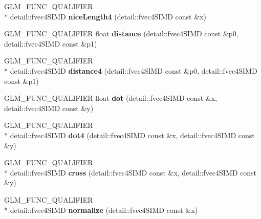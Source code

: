 \begin{DoxyCompactItemize}
\item 
\hypertarget{namespaceglm_a8279db21d38cadc5efaa0c8efababb1b}{G\-L\-M\-\_\-\-F\-U\-N\-C\-\_\-\-Q\-U\-A\-L\-I\-F\-I\-E\-R \\*
detail\-::fvec4\-S\-I\-M\-D {\bfseries nice\-Length4} (detail\-::fvec4\-S\-I\-M\-D const \&x)}\label{namespaceglm_a8279db21d38cadc5efaa0c8efababb1b}

\item 
\hypertarget{namespaceglm_ae716903872179576658f5eb6e2632558}{G\-L\-M\-\_\-\-F\-U\-N\-C\-\_\-\-Q\-U\-A\-L\-I\-F\-I\-E\-R float {\bfseries distance} (detail\-::fvec4\-S\-I\-M\-D const \&p0, detail\-::fvec4\-S\-I\-M\-D const \&p1)}\label{namespaceglm_ae716903872179576658f5eb6e2632558}

\item 
\hypertarget{namespaceglm_a5256e6d2d2a82b810f92fc02f64819fb}{G\-L\-M\-\_\-\-F\-U\-N\-C\-\_\-\-Q\-U\-A\-L\-I\-F\-I\-E\-R \\*
detail\-::fvec4\-S\-I\-M\-D {\bfseries distance4} (detail\-::fvec4\-S\-I\-M\-D const \&p0, detail\-::fvec4\-S\-I\-M\-D const \&p1)}\label{namespaceglm_a5256e6d2d2a82b810f92fc02f64819fb}

\item 
\hypertarget{namespaceglm_ae84ca0b0e48c6a79faac0eea8bc7a913}{G\-L\-M\-\_\-\-F\-U\-N\-C\-\_\-\-Q\-U\-A\-L\-I\-F\-I\-E\-R float {\bfseries dot} (detail\-::fvec4\-S\-I\-M\-D const \&x, detail\-::fvec4\-S\-I\-M\-D const \&y)}\label{namespaceglm_ae84ca0b0e48c6a79faac0eea8bc7a913}

\item 
\hypertarget{namespaceglm_af55916a3764adaa7537f5e3e9ccacb81}{G\-L\-M\-\_\-\-F\-U\-N\-C\-\_\-\-Q\-U\-A\-L\-I\-F\-I\-E\-R \\*
detail\-::fvec4\-S\-I\-M\-D {\bfseries dot4} (detail\-::fvec4\-S\-I\-M\-D const \&x, detail\-::fvec4\-S\-I\-M\-D const \&y)}\label{namespaceglm_af55916a3764adaa7537f5e3e9ccacb81}

\item 
\hypertarget{namespaceglm_a06a52dedca29da951493c4c6f6020573}{G\-L\-M\-\_\-\-F\-U\-N\-C\-\_\-\-Q\-U\-A\-L\-I\-F\-I\-E\-R \\*
detail\-::fvec4\-S\-I\-M\-D {\bfseries cross} (detail\-::fvec4\-S\-I\-M\-D const \&x, detail\-::fvec4\-S\-I\-M\-D const \&y)}\label{namespaceglm_a06a52dedca29da951493c4c6f6020573}

\item 
\hypertarget{namespaceglm_aabe6e7b8dbd2e5db215f973e474dd951}{G\-L\-M\-\_\-\-F\-U\-N\-C\-\_\-\-Q\-U\-A\-L\-I\-F\-I\-E\-R \\*
detail\-::fvec4\-S\-I\-M\-D {\bfseries normalize} (detail\-::fvec4\-S\-I\-M\-D const \&x)}\label{namespaceglm_aabe6e7b8dbd2e5db215f973e474dd951}


\end{DoxyCompactItemize}
